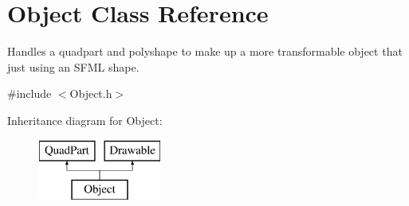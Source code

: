 \hypertarget{class_object}{}\section{Object Class Reference}
\label{class_object}


Handles a quadpart and polyshape to make up a more transformable object that just using an S\+F\+ML shape.  




{\ttfamily \#include $<$Object.\+h$>$}

Inheritance diagram for Object\+:\begin{figure}[H]
\begin{center}
\leavevmode
\includegraphics[height=2.000000cm]{class_object}
\end{center}
\end{figure}
